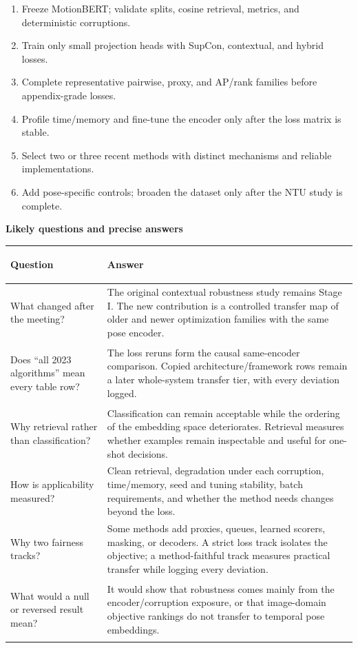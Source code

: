 \documentclass[10pt]{article}
\begin{document}
\begin{implbox}[title=\textbf{Lowest-risk implementation sequence}]
\begin{enumerate}[leftmargin=*,itemsep=1pt,topsep=1pt]
\item Freeze MotionBERT; validate splits, cosine retrieval, metrics, and deterministic corruptions.
\item Train only small projection heads with SupCon, contextual, and hybrid losses.
\item Complete representative pairwise, proxy, and AP/rank families before appendix-grade losses.
\item Profile time/memory and fine-tune the encoder only after the loss matrix is stable.
\item Select two or three recent methods with distinct mechanisms and reliable implementations.
\item Add pose-specific controls; broaden the dataset only after the NTU study is complete.
\end{enumerate}
\end{implbox}

\textbf{Likely questions and precise answers}\par\vspace{1mm}
{\small
\renewcommand{\arraystretch}{1.05}
\begin{tabularx}{\textwidth}{>{\bfseries\raggedright\arraybackslash}p{}Y}
\toprule
Question & Answer \\
\midrule
What changed after the meeting? & The original contextual robustness study remains Stage I. The new contribution is a controlled transfer map of older and newer optimization families with the same pose encoder. \\
Does ``all 2023 algorithms'' mean every table row? & The loss reruns form the causal same-encoder comparison. Copied architecture/framework rows remain a later whole-system transfer tier, with every deviation logged. \\
Why retrieval rather than classification? & Classification can remain acceptable while the ordering of the embedding space deteriorates. Retrieval measures whether examples remain inspectable and useful for one-shot decisions. \\
How is applicability measured? & Clean retrieval, degradation under each corruption, time/memory, seed and tuning stability, batch requirements, and whether the method needs changes beyond the loss. \\
Why two fairness tracks? & Some methods add proxies, queues, learned scorers, masking, or decoders. A strict loss track isolates the objective; a method-faithful track measures practical transfer while logging every deviation. \\
What would a null or reversed result mean? & It would show that robustness comes mainly from the encoder/corruption exposure, or that image-domain objective rankings do not transfer to temporal pose embeddings. \\
\bottomrule
\end{tabularx}}
\end{document}
